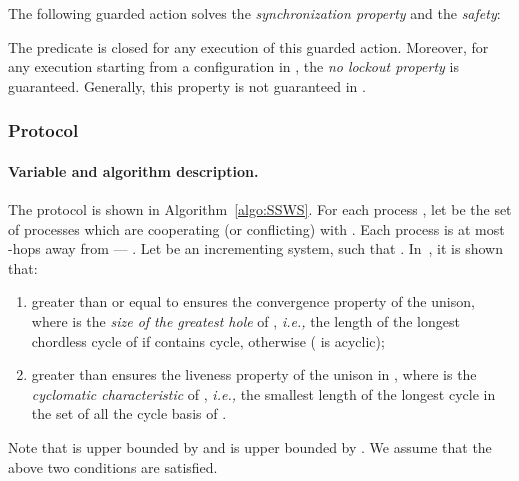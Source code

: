 \documentclass[11pt]{article}
\newcommand{\ie}{\emph{i.e., }}
\begin{document}
The following guarded action solves the \emph{synchronization property} and the \emph{safety}:
\begin{center}
\end{center}
The predicate  is closed for any execution of this guarded action.  Moreover,
for any execution starting from a configuration in , the \emph{no lockout property} is
guaranteed. Generally, this property is not guaranteed in .








\subsubsection{Protocol }


\paragraph{Variable and algorithm description.} 
The protocol is shown in Algorithm~\ref{algo:SSWS}.
For each process , let  be the set of processes which are cooperating (or conflicting) with .  
Each process  is at most -hops away from  --- .
Let  be an incrementing system, such that .
In~\cite{BPV04b}, it is shown that:
\begin{enumerate}
\item   greater than or equal to   ensures the convergence property of the unison, 
where  is the \emph{size of the greatest hole} of , \ie the length of the longest chordless cycle of  if  contains
cycle,  otherwise ( is acyclic);
\item   greater than   ensures the liveness property of the unison in , 
where  is the \emph{cyclomatic characteristic} of , \ie the smallest length of the longest 
cycle in the set of all the cycle basis of . 
\end{enumerate}
Note that  is upper bounded by  and  is upper bounded by .
We assume that the above two conditions are satisfied.  
\end{document}
